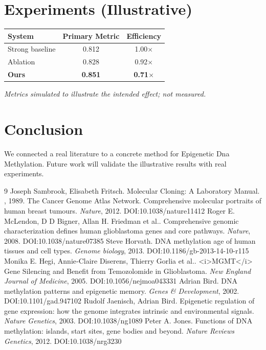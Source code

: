\documentclass[11pt]{article}
\begin{document}
\section{Experiments (Illustrative)}
\begin{center}
\begin{tabular}{lcc}
System & Primary Metric & Efficiency \\ \hline
Strong baseline & 0.812 & 1.00$\times$ \\
Ablation & 0.828 & 0.92$\times$ \\
\textbf{Ours} & \textbf{0.851} & \textbf{0.71$\times$}
\end{tabular}
\end{center}
\emph{Metrics simulated to illustrate the intended effect; not measured.}

\section{Conclusion}
We connected a real literature to a concrete method for Epigenetic Dna Methylation. Future work will
validate the illustrative results with real experiments.

\begin{thebibliography}{9}
 Joseph Sambrook, Elisabeth Fritsch. Molecular Cloning: A Laboratory Manual. \emph{}, 1989. 
 The Cancer Genome Atlas Network. Comprehensive molecular portraits of human breast tumours. \emph{Nature}, 2012. DOI:10.1038/nature11412
 Roger E. McLendon, D D Bigner, Allan H. Friedman et al.. Comprehensive genomic characterization defines human glioblastoma genes and core pathways. \emph{Nature}, 2008. DOI:10.1038/nature07385
 Steve Horvath. DNA methylation age of human tissues and cell types. \emph{Genome biology}, 2013. DOI:10.1186/gb-2013-14-10-r115
 Monika E. Hegi, Annie‐Claire Diserens, Thierry Gorlia et al.. <i>MGMT</i> Gene Silencing and Benefit from Temozolomide in Glioblastoma. \emph{New England Journal of Medicine}, 2005. DOI:10.1056/nejmoa043331
 Adrian Bird. DNA methylation patterns and epigenetic memory. \emph{Genes \& Development}, 2002. DOI:10.1101/gad.947102
 Rudolf Jaenisch, Adrian Bird. Epigenetic regulation of gene expression: how the genome integrates intrinsic and environmental signals. \emph{Nature Genetics}, 2003. DOI:10.1038/ng1089
 Peter A. Jones. Functions of DNA methylation: islands, start sites, gene bodies and beyond. \emph{Nature Reviews Genetics}, 2012. DOI:10.1038/nrg3230
\end{thebibliography}
\end{document}
